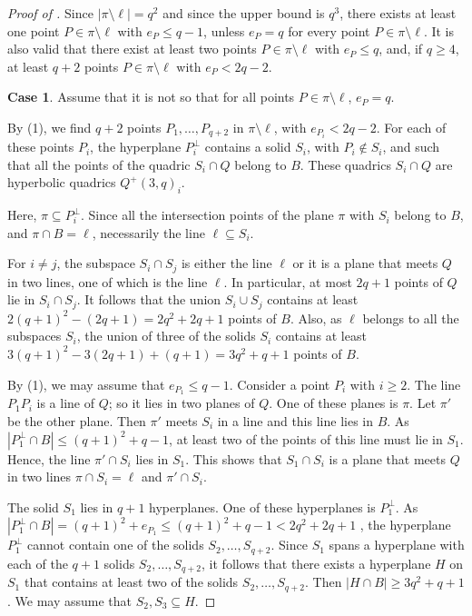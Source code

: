 \documentclass[a4paper]{article}
\theoremstyle{definition}
\begin{document}
\begin{proof}[Proof of ]
Since $|\pi\setminus \ell|= q^2$ and since the upper bound is $q^3$, there exists at least one point $P\in\pi\setminus \ell$ with $e_P\leq q-1$, unless $e_P=q$ for every point $P\in\pi\setminus \ell$. It is also valid that there exist at least two points $P\in\pi\setminus \ell$ with
$e_P \leq  q$, and, if $q \geq 4$, at least $q + 2$ points $P\in\pi\setminus \ell$ with $e_P < 2q - 2$.

\bigskip

   {\bf Case 1}. Assume that it is not so that for all  points $P\in\pi\setminus \ell$, $e_P=q$. \bigskip

   By (1), we find $q + 2$ points $P_1,\dots, P_{q+2}$  in $\pi \setminus  \ell$,  with $e_{P_i} < 2q - 2$. For each of these points
$P_i$, the hyperplane $P_i^\perp$ contains a solid $S_i$, with $P_i \not\in S_i$, and such that all the points of the quadric
$S_i \cap Q$ belong to  $B$. These quadrics $S_i \cap  Q$ are hyperbolic quadrics  $Q^+(3, q)_i$.

Here, $\pi\subseteq P_i^\perp$. Since all the intersection points of the plane $\pi$ with $S_i$ belong to $B$, and $\pi\cap B=\ell$, necessarily the line $\ell\subseteq S_i$.

For $i \neq j$, the subspace $S_i \cap  S_j$ is either the line $\ell$ or it is a plane that meets $Q$  in two
lines, one of which is the line $\ell$. In particular, at most $2q + 1$ points of $Q$  lie in $S_i \cap  S_j$. It follows
that the union $S_i\cup  S_j$ contains at least $2(q + 1)^2 - (2q + 1) = 2q^2 + 2q + 1$ points of
$B$. Also, as $\ell$ belongs to all the subspaces $S_i$, the union of three of the solids $S_i$ contains at least
$3(q+ 1)^2 - 3(2q + 1) + (q+ 1) = 3q^2 + q+ 1 $ points of $B$.

By (1), we may assume that $e_{P_1} \leq  q- 1$. Consider a point $P_i$ with $i \geq 2$. The line $P_1P_i$ is a
line of $Q$; so it lies in two planes of $Q$. One of these planes is $\pi$. Let $\pi'$ be the other plane.
Then $\pi'$  meets $S_i$ in a line and this line lies in $B$. As $|P_1^\perp \cap B|\leq  (q + 1)^2 + q - 1$, at least
two of the points of this line must lie in $S_1$. Hence, the line $\pi'\cap S_i$ lies in $S_1$. This shows
that $S_1 \cap  S_i$ is a plane that meets $Q$ in two lines $\pi\cap  S_i = \ell$ and $\pi'\cap  S_i$.

The solid $S_1$ lies in $q + 1$ hyperplanes. One of these hyperplanes is $P_1^\perp$. As $|P_1^\perp \cap B| = (q + 1)^2 + e_{P_1} \leq (q+1)^2+q-1<
2q^2+2q+1$ , the hyperplane $P_1^\perp$ cannot contain one of the solids $S_2, \dots, S_{q+2}$. Since $S_1$ spans a
hyperplane with each of the $q+ 1$ solids $S_2,\dots,S_{q+2}$, it follows that there exists a hyperplane $H$
on $S_1$ that contains at least two of the solids $S_2,\dots,S_{q+2}$. Then $|H\cap B|\geq 3q^2 + q + 1$. We
may assume that $S_2,S_3\subseteq H$.


\end{proof}
\end{document}
